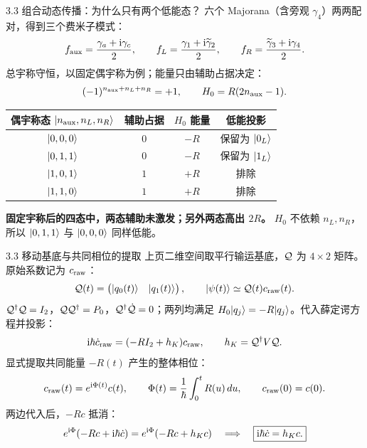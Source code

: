 \documentclass[aspectratio=169,11pt]{beamer}
\begin{document}
\begin{frame}[t]{3.3 组合动态传播：为什么只有两个低能态？}
  \small
  \setlength{\abovedisplayskip}{5pt}\setlength{\belowdisplayskip}{5pt}
  六个 Majorana（含旁观 $\gamma_4$）两两配对，得到三个费米子模式：
  \[
    f_{\rm aux}=\frac{\gamma_a+\mathrm{i}\gamma_c}{2},\qquad
    f_L=\frac{\gamma_1+\mathrm{i}\widetilde\gamma_2}{2},\qquad
    f_R=\frac{\widetilde\gamma_3+\mathrm{i}\gamma_4}{2}.
  \]
  总宇称守恒，以固定偶宇称为例；能量只由辅助占据决定：
  \[
    (-1)^{n_{\rm aux}+n_L+n_R}=+1,\qquad H_0=R(2n_{\rm aux}-1).
  \]
  {\centering
    \renewcommand{\arraystretch}{1.15}
    \begin{tabular}{cccc}
      \toprule 偶宇称态 $\lvert n_{\rm aux},n_L,n_R\rangle$ & 辅助占据 & $H_0$ 能量 & 低能投影\\\midrule
      $\lvert 0,0,0\rangle$ & $0$ & $-R$ & 保留为 $\lvert 0_L\rangle$\\
      $\lvert 0,1,1\rangle$ & $0$ & $-R$ & 保留为 $\lvert 1_L\rangle$\\
      $\lvert 1,0,1\rangle$ & $1$ & $+R$ & 排除\\
      $\lvert 1,1,0\rangle$ & $1$ & $+R$ & 排除\\\bottomrule
    \end{tabular}\par}
  \vspace{.1cm}
  \textbf{固定宇称后的四态中，两态辅助未激发；另外两态高出 $2R$。}
  $H_0$ 不依赖 $n_L,n_R$，所以 $\lvert 0,1,1\rangle$ 与 $\lvert 0,0,0\rangle$ 同样低能。
\end{frame}

\begin{frame}[t]{3.3 移动基底与共同相位的提取}
  \small
  \setlength{\abovedisplayskip}{4pt}\setlength{\belowdisplayskip}{4pt}
  上页二维空间取平行输运基底，$\mathcal Q$ 为 $4\times2$ 矩阵。原始系数记为 $c_{\rm raw}$：
  \[
    \mathcal Q(t)=\begin{pmatrix}\lvert q_0(t)\rangle&\lvert q_1(t)\rangle\end{pmatrix},\qquad
    \lvert \psi(t)\rangle\simeq\mathcal Q(t)c_{\rm raw}(t).
  \]
  $\mathcal Q^\dagger\mathcal Q=I_2$，$\mathcal Q\mathcal Q^\dagger=P_0$，$\mathcal Q^\dagger\dot{\mathcal Q}=0$；两列均满足
  $H_0\lvert q_j\rangle=-R\lvert q_j\rangle$。代入薛定谔方程并投影：
  \[
    \mathrm{i}\hbar\dot c_{\rm raw}=(-RI_2+h_K)c_{\rm raw},\qquad h_K=\mathcal Q^\dagger V\mathcal Q.
  \]
  显式提取共同能量 $-R(t)$ 产生的整体相位：
  \[
    c_{\rm raw}(t)=e^{\mathrm{i}\Phi(t)}c(t),\qquad
    \Phi(t)=\frac1\hbar\int_0^tR(u)\,du,\qquad c_{\rm raw}(0)=c(0).
  \]
  两边代入后，$-Rc$ 抵消：
  \[
    e^{\mathrm{i}\Phi}(-Rc+\mathrm{i}\hbar\dot c)=e^{\mathrm{i}\Phi}(-Rc+h_Kc)
    \quad\Longrightarrow\quad \boxed{\mathrm{i}\hbar\dot c=h_Kc.}
  \]
\end{frame}
\end{document}
